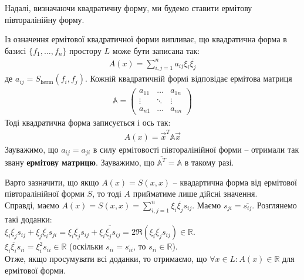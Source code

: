 \documentclass{math_library}
\begin{document}
\begin{remark}
Надалі, визначаючи квадратичну форму, ми будемо ставити ермітову півторалінійну форму.
\end{remark}

\noindent
Із означення ермітової квадратичної форми випливає, що квадратична форма в базисі $\{f_1,\dots,f_n\}$ простору $L$ може бути записана так:
\begin{align*}
A(x) = \displaystyle\sum_{i,j=1}^n a_{ij} \xi_i \overline{\xi_j}
\end{align*}
де $a_{ij} = S_{\text{herm}}(f_i,f_j)$. Кожній квадратичній формі відповідає ермітова матриця
\begin{align*}
\mathbb{A} = \begin{pmatrix}
a_{11} & \dots & a_{1n} \\
\vdots & \ddots & \vdots \\
a_{n1} & \dots & a_{nn}
\end{pmatrix}
\end{align*}
Тоді квадратична форма записується і ось так:
\begin{align*}
A(x) = \vec{x}^T \mathbb{A} \vec{x}
\end{align*}
\noindent
Зауважимо, що $a_{ij} = a_{ji}$ в силу ермітовості півторалінійної форми -- отримали так звану \textbf{ермітову матрицю}. Зауважимо, що $\overline{\mathbb{A}^T} = \mathbb{A}$ в такому разі.

\begin{remark}
Варто зазначити, що якщо $A(x) = S(x,x)$ -- квадартична форма від ермітової півторалінійної форми $S$, то тоді $A$ прийматиме лише дійсні значення.\\
Справді, маємо $A(x) = S(x,x) = \displaystyle\sum_{i,j=1}^n \xi_i \overline{\xi_j} s_{ij}$. Маємо $s_{ji} = \overline{s_{ij}}$. Розглянемо такі доданки:\\
$\xi_i \overline{\xi_j} s_{ij} + \xi_j \overline{\xi_i} s_{ji} = \xi_i \overline{\xi_j} s_{ij} + \overline{\xi_i \overline{\xi_j} s_{ij}} = 2 \Re (\xi_i \overline{\xi_j} s_{ij}) \in \mathbb{R}$.\\
$\xi_i \overline{\xi_i} s_{ii} = \xi_i^2 s_{ii} \in \mathbb{R}$ (оскільки $s_{ii} = \overline{s_{ii}}$, то $s_{ii} \in \mathbb{R}$).\\
Отже, якщо просумувати всі доданки, то отримаємо, що $\forall x \in L: A(x) \in \mathbb{R}$ для ермітової форми.
\end{remark}
\end{document}
